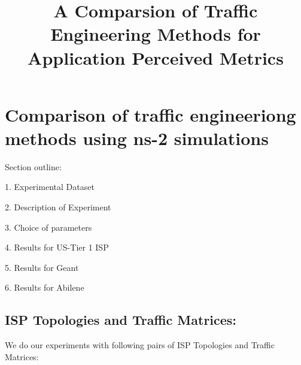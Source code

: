 \documentclass[a4paper,10pt]{article}
\title{A Comparsion of Traffic Engineering Methods for Application Perceived Metrics}
\date{}
\author{}
\begin{document}
\maketitle
\section{Comparison of traffic engineeriong methods using ns-2 simulations}
\renewcommand{\topfraction}{.9}
\renewcommand{\bottomfraction}{.9}
\renewcommand{\textfraction}{.1}

Section outline:

1. Experimental Dataset

2. Description of Experiment

3. Choice of parameters

4. Results for US-Tier 1 ISP

5. Results for Geant

6. Results for Abilene

\subsection{ISP Topologies and Traffic Matrices:}
We do our experiments with following pairs of ISP Topologies and Traffic Matrices:
\end{document}
